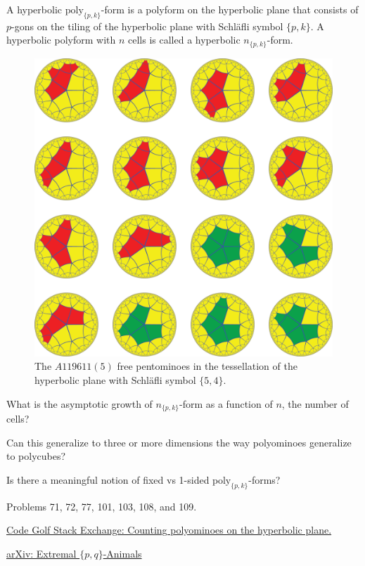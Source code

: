 \documentclass{article}
\begin{document}
A hyperbolic $\mathrm{poly}_{\{p,k\}}$-form is a polyform on the hyperbolic plane that
consists of $p$-gons on the tiling of the hyperbolic plane with Schl\"afli
symbol $\{p,k\}$.
A hyperbolic polyform with $n$ cells is called a hyperbolic $n_{\{p,k\}}$-form.

\begin{figure}[ht!]
  \centering
  \includegraphics[scale=0.15]{assets/120_problem/5_4_hyperbolic_polyominoes.png}
  \caption{
    The $A119611(5)$ free pentominoes in the tessellation of the
    hyperbolic plane with Schl\"afli symbol $\{5,4\}$.
  }
\end{figure}

\begin{question}
  What is the asymptotic growth of $n_{\{p,k\}}$-form as a function of $n$,
  the number of cells?
\end{question}

\begin{related}
  \item Can this generalize to three or more dimensions the way polyominoes
  generalize to polycubes?
  \item Is there a meaningful notion of fixed vs 1-sided
    $\mathrm{poly}_{\{p,k\}}$-forms?
\end{related}


\begin{references}
  \item Problems 71, 72, 77, 101, 103, 108, and 109.
  \item \href{https://codegolf.stackexchange.com/q/200122/53884}{Code Golf Stack Exchange: Counting polyominoes on the hyperbolic plane.}
  \item \href{https://arxiv.org/abs/2109.05331}{arXiv: Extremal $\{p,q\}$-Animals}
\end{references}
\end{document}
